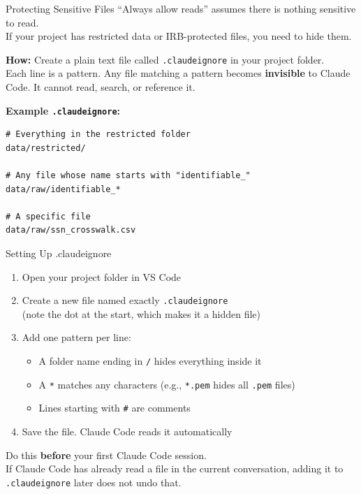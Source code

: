 \documentclass[aspectratio=169, 11pt]{beamer}
\begin{document}
\begin{frame}[fragile]{Protecting Sensitive Files}
  ``Always allow reads'' assumes there is nothing sensitive to read.\\
  If your project has restricted data or IRB-protected files, you need to hide them.

  \vspace{0.5em}
  \textbf{How:} Create a plain text file called \texttt{.claudeignore} in your project folder.\\
  Each line is a pattern. Any file matching a pattern becomes \textbf{invisible} to Claude Code. It cannot read, search, or reference it.

  \vspace{0.5em}
  \textbf{Example \texttt{.claudeignore}:}
  \begin{lstlisting}
# Everything in the restricted folder
data/restricted/

# Any file whose name starts with "identifiable_"
data/raw/identifiable_*

# A specific file
data/raw/ssn_crosswalk.csv
  \end{lstlisting}
\end{frame}

\begin{frame}{Setting Up .claudeignore}
  \begin{enumerate}
    \item Open your project folder in VS Code
    \item Create a new file named exactly \texttt{.claudeignore}\\
      {\small (note the dot at the start, which makes it a hidden file)}
    \item Add one pattern per line:
      \begin{itemize}
        \item A folder name ending in \texttt{/} hides everything inside it
        \item A \texttt{*} matches any characters (e.g., \texttt{*.pem} hides all \texttt{.pem} files)
        \item Lines starting with \texttt{\#} are comments
      \end{itemize}
    \item Save the file. Claude Code reads it automatically
  \end{enumerate}

  \vspace{0.8em}
  \alert{Do this \textbf{before} your first Claude Code session.}\\
  If Claude Code has already read a file in the current conversation, adding it to \texttt{.claudeignore} later does not undo that.
\end{frame}
\end{document}
